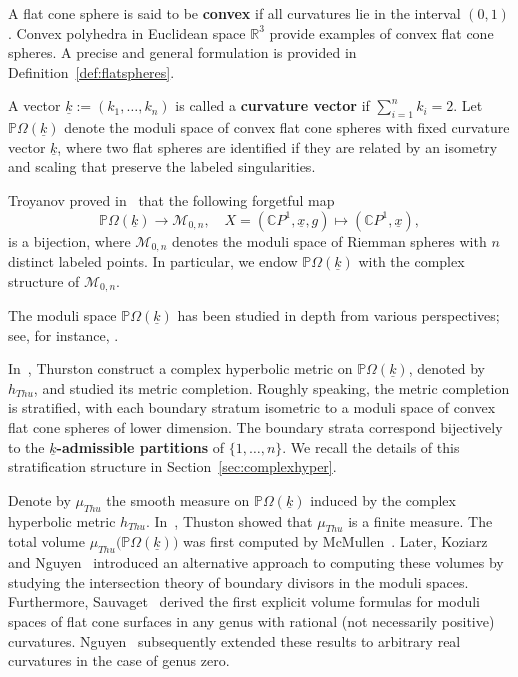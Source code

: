 \documentclass{compositio}
\numberwithin{equation}{section}
\numberwithin{figure}{section}
\theoremstyle{definition}
\theoremstyle{plain}
\begin{document}
A flat cone sphere is said to be \textbf{convex} if all curvatures lie in the interval $(0,1)$. Convex polyhedra in Euclidean space $\mathbb{R}^3$ provide examples of convex flat cone spheres. A precise and general formulation is provided in Definition~\ref{def:flatspheres}.

A vector $\underline{k} := (k_1,\ldots,k_n)$ is called a \textbf{curvature vector} if $\sum_{i=1}^n k_i = 2$. Let $\mathbb{P}\Omega(\underline{k})$ denote the moduli space of convex flat cone spheres with fixed curvature vector $\underline{k}$, where two flat spheres are identified if they are related by an isometry and scaling that preserve the labeled singularities. 

Troyanov proved in~\cite{Tro1986} that the following forgetful map
$$
\mathbb{P}\Omega(\underline{k}) \to \mathcal{M}_{0,n}, \quad X = (\mathbb{C}P^1, \underline{x}, g) \mapsto (\mathbb{C}P^1, \underline{x}),
$$
is a bijection, where $\mathcal{M}_{0,n}$ denotes the moduli space of Riemman spheres with $n$ distinct labeled points. In particular, we endow $\mathbb{P}\Omega(\underline{k})$ with the complex structure of $\mathcal{M}_{0,n}$.

The moduli space $\mathbb{P}\Omega(\underline{k})$ has been studied in depth from various perspectives; see, for instance, \cite{DM, thu, McMullen, KN, SmillieTriangulations, sauvaget2024volumesmodulispacesflat, Ngu24}.

In~\cite{thu}, Thurston construct a complex hyperbolic metric on $\mathbb{P}\Omega(\underline{k})$, denoted by $h_{Thu}$, and studied its metric completion. Roughly speaking, the metric completion is stratified, with each boundary stratum isometric to a moduli space of convex flat cone spheres of lower dimension. The boundary strata correspond bijectively to the \textbf{$\underline{k}$-admissible partitions} of $\{1,\ldots,n\}$. We recall the details of this stratification structure in Section~\ref{sec:complexhyper}.

Denote by $\mu_{Thu}$ the smooth measure on $\mathbb{P}\Omega(\underline{k})$ induced by the complex hyperbolic metric $h_{Thu}$. In~\cite{thu}, Thuston showed that $\mu_{Thu}$ is a finite measure. The total volume $\mu_{Thu}\big(\mathbb{P}\Omega(\underline{k})\big)$ was first computed by McMullen~\cite{McMullen}. Later, Koziarz and Nguyen~\cite{KN} introduced an alternative approach to computing these volumes by studying the intersection theory of boundary divisors in the moduli spaces. Furthermore, Sauvaget~\cite{sauvaget2024volumesmodulispacesflat} derived the first explicit volume formulas for moduli spaces of flat cone surfaces in any genus with rational (not necessarily positive) curvatures. Nguyen~\cite{Ngu24} subsequently extended these results to arbitrary real curvatures in the case of genus zero.
\end{document}
